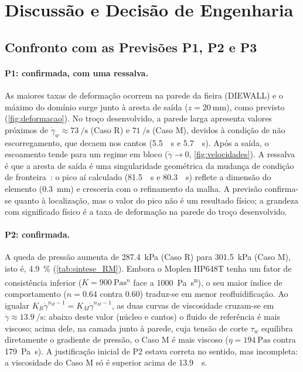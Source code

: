 \section{Discussão e Decisão de Engenharia}
\label{sec:discussao}

\subsection{Confronto com as Previsões P1, P2 e P3}

\paragraph{P1: confirmada, com uma ressalva.} As maiores taxas de deformação ocorrem na parede da fieira (DIEWALL) e o máximo do domínio surge junto à aresta de saída ($z = \qty{20}{\milli\metre}$), como previsto (\autoref{fig:deformacao}). No troço desenvolvido, a parede larga apresenta valores próximos de $\dot{\gamma}_w \approx \qty{73}{\per\second}$ (Caso R) e $\qty{71}{\per\second}$ (Caso M), devidos à condição de não escorregamento, que decaem nos cantos (\qty{5,5}{\per\second} e \qty{5,7}{\per\second}). Após a saída, o escoamento tende para um regime em bloco ($\dot{\gamma} \to 0$, \autoref{fig:velocidades}). A ressalva é que a aresta de saída é uma singularidade geométrica da mudança de condição de fronteira~\cite{Comminal2018Extrudate}: o pico aí calculado (\qty{81,5}{\per\second} e \qty{80,3}{\per\second}) reflete a dimensão do elemento (\qty{0,3}{\milli\metre}) e cresceria com o refinamento da malha. A previsão confirma-se quanto à localização, mas o valor do pico não é um resultado físico; a grandeza com significado físico é a taxa de deformação na parede do troço desenvolvido.

\paragraph{P2: confirmada.} A queda de pressão aumenta de \qty{287,4}{\kilo\pascal} (Caso R) para \qty{301,5}{\kilo\pascal} (Caso M), isto é, \qty{4,9}{\percent} (\autoref{tab:sintese_RM}). Embora o Moplen HP648T tenha um fator de consistência inferior ($K = \qty{900}{\pascal\second\tothe{n}}$ face a \qty{1000}{\pascal\second\tothe{n}}), o seu maior índice de comportamento ($n = \num{0,64}$ contra \num{0,60}) traduz-se em menor reofluidificação. Ao igualar $K_R\dot{\gamma}^{n_R-1} = K_M\dot{\gamma}^{n_M-1}$, as duas curvas de viscosidade cruzam-se em $\dot{\gamma} \approx \qty{13,9}{\per\second}$: abaixo deste valor (núcleo e cantos) o fluido de referência é mais viscoso; acima dele, na camada junto à parede, cuja tensão de corte $\tau_w$ equilibra diretamente o gradiente de pressão, o Caso M é mais viscoso ($\eta = \qty{194}{\pascal\second}$ contra \qty{179}{\pascal\second}). A justificação inicial de P2 estava correta no sentido, mas incompleta: a viscosidade do Caso M só é superior acima de \qty{13,9}{\per\second}.

